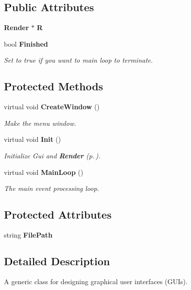 \subsection*{Public Attributes}
\begin{CompactItemize}
\item 
{\bf Render} $\ast$ {\bf R}
\item 
bool {\bf Finished}
\begin{CompactList}\small\item\em Set to true if you want to main loop to terminate.\item\end{CompactList}\end{CompactItemize}
\subsection*{Protected Methods}
\begin{CompactItemize}
\item 
virtual void {\bf Create\-Window} ()
\begin{CompactList}\small\item\em Make the menu window.\item\end{CompactList}\item 
virtual void {\bf Init} ()
\begin{CompactList}\small\item\em Initialize Gui and {\bf Render} {\rm (p.\,\pageref{classRender})}.\item\end{CompactList}\item 
virtual void {\bf Main\-Loop} ()
\begin{CompactList}\small\item\em The main event processing loop.\item\end{CompactList}\end{CompactItemize}
\subsection*{Protected Attributes}
\begin{CompactItemize}
\item 
string {\bf File\-Path}
\end{CompactItemize}


\subsection{Detailed Description}
A generic class for designing graphical user interfaces (GUIs).

